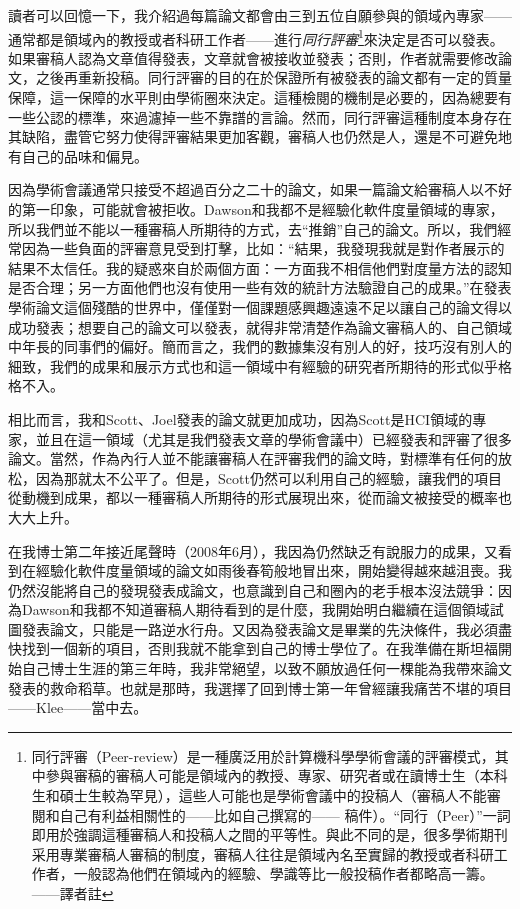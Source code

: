 \documentclass[12pt,UTF8,nofonts]{book}
\begin{document}
讀者可以回憶一下，我介紹過每篇論文都會由三到五位自願參與的領域內專家——通常都是領域內的教授或者科研工作者——進行\emph{同行評審}\footnote{同行評審（Peer-review）是一種廣泛用於計算機科學學術會議的評審模式，其中參與審稿的審稿人可能是領域內的教授、專家、研究者或在讀博士生（本科生和碩士生較為罕見），這些人可能也是學術會議中的投稿人（審稿人不能審閱和自己有利益相關性的——比如自己撰寫的—— 稿件）。“同行（Peer）”一詞即用於強調這種審稿人和投稿人之間的平等性。與此不同的是，很多學術期刊采用專業審稿人審稿的制度，審稿人往往是領域內名至實歸的教授或者科研工作者，一般認為他們在領域內的經驗、學識等比一般投稿作者都略高一籌。——譯者註}來決定是否可以發表。如果審稿人認為文章值得發表，文章就會被接收並發表；否則，作者就需要修改論文，之後再重新投稿。同行評審的目的在於保證所有被發表的論文都有一定的質量保障，這一保障的水平則由學術圈來決定。這種檢閱的機制是必要的，因為總要有一些公認的標準，來過濾掉一些不靠譜的言論。然而，同行評審這種制度本身存在其缺陷，盡管它努力使得評審結果更加客觀，審稿人也仍然是人，還是不可避免地有自己的品味和偏見。

因為學術會議通常只接受不超過百分之二十的論文，如果一篇論文給審稿人以不好的第一印象，可能就會被拒收。Dawson和我都不是經驗化軟件度量領域的專家，所以我們並不能以一種審稿人所期待的方式，去“推銷”自己的論文。所以，我們經常因為一些負面的評審意見受到打擊，比如：“結果，我發現我就是對作者展示的結果不太信任。我的疑惑來自於兩個方面：一方面我不相信他們對度量方法的認知是否合理；另一方面他們也沒有使用一些有效的統計方法驗證自己的成果。”在發表學術論文這個殘酷的世界中，僅僅對一個課題感興趣遠遠不足以讓自己的論文得以成功發表；想要自己的論文可以發表，就得非常清楚作為論文審稿人的、自己領域中年長的同事們的偏好。簡而言之，我們的數據集沒有別人的好，技巧沒有別人的細致，我們的成果和展示方式也和這一領域中有經驗的研究者所期待的形式似乎格格不入。

相比而言，我和Scott、Joel發表的論文就更加成功，因為Scott是HCI領域的專家，並且在這一領域（尤其是我們發表文章的學術會議中）已經發表和評審了很多論文。當然，作為內行人並不能讓審稿人在評審我們的論文時，對標準有任何的放松，因為那就太不公平了。但是，Scott仍然可以利用自己的經驗，讓我們的項目從動機到成果，都以一種審稿人所期待的形式展現出來，從而論文被接受的概率也大大上升。

\breakline

在我博士第二年接近尾聲時（2008年6月），我因為仍然缺乏有說服力的成果，又看到在經驗化軟件度量領域的論文如雨後春筍般地冒出來，開始變得越來越沮喪。我仍然沒能將自己的發現發表成論文，也意識到自己和圈內的老手根本沒法競爭：因為Dawson和我都不知道審稿人期待看到的是什麼，我開始明白繼續在這個領域試圖發表論文，只能是一路逆水行舟。又因為發表論文是畢業的先決條件，我必須盡快找到一個新的項目，否則我就不能拿到自己的博士學位了。在我準備在斯坦福開始自己博士生涯的第三年時，我非常絕望，以致不願放過任何一棵能為我帶來論文發表的救命稻草。也就是那時，我選擇了回到博士第一年曾經讓我痛苦不堪的項目——Klee——當中去。
\end{document}
